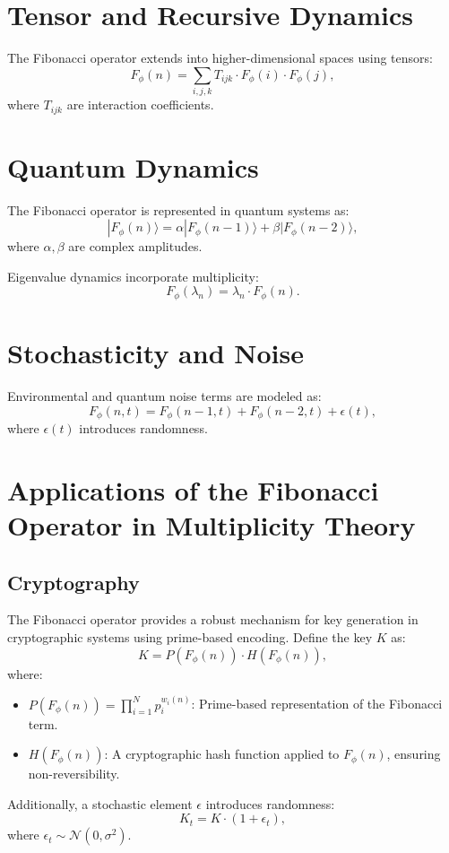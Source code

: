 \documentclass{article}
\theoremstyle{plain}
\begin{document}
\section{Tensor and Recursive Dynamics}
The Fibonacci operator extends into higher-dimensional spaces using tensors:
\[
F_\phi(n) = \sum_{i,j,k} T_{ijk} \cdot F_\phi(i) \cdot F_\phi(j),
\]
where \( T_{ijk} \) are interaction coefficients.

\section{Quantum Dynamics}
The Fibonacci operator is represented in quantum systems as:
\[
|F_\phi(n)\rangle = \alpha |F_\phi(n-1)\rangle + \beta |F_\phi(n-2)\rangle,
\]
where \( \alpha, \beta \) are complex amplitudes.

Eigenvalue dynamics incorporate multiplicity:
\[
F_\phi(\lambda_n) = \lambda_n \cdot F_\phi(n).
\]

\section{Stochasticity and Noise}
Environmental and quantum noise terms are modeled as:
\[
F_\phi(n, t) = F_\phi(n-1, t) + F_\phi(n-2, t) + \epsilon(t),
\]
where \( \epsilon(t) \) introduces randomness.

\section{Applications of the Fibonacci Operator in Multiplicity Theory}

\subsection{Cryptography}
The Fibonacci operator provides a robust mechanism for key generation in cryptographic systems using prime-based encoding. Define the key \( K \) as:
\[
K = P(F_\phi(n)) \cdot H(F_\phi(n)),
\]
where:
\begin{itemize}
    \item \( P(F_\phi(n)) = \prod_{i=1}^{N} p_i^{w_i(n)} \): Prime-based representation of the Fibonacci term.
    \item \( H(F_\phi(n)) \): A cryptographic hash function applied to \( F_\phi(n) \), ensuring non-reversibility.
\end{itemize}

Additionally, a stochastic element \( \epsilon \) introduces randomness:
\[
K_t = K \cdot (1 + \epsilon_t),
\]
where \( \epsilon_t \sim \mathcal{N}(0, \sigma^2) \).
\end{document}
